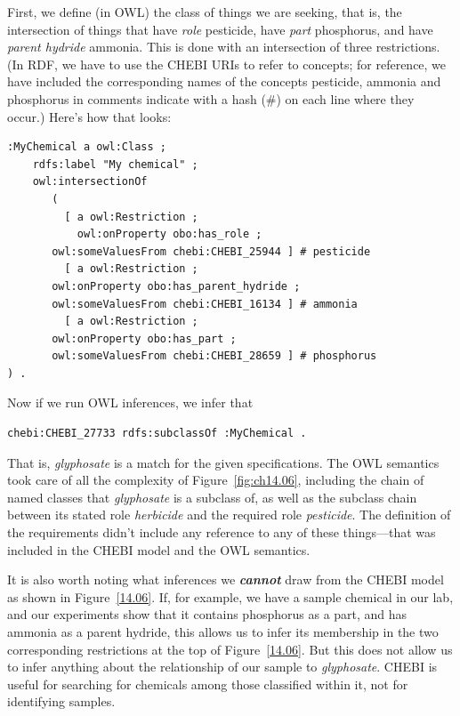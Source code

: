 First, we define (in OWL) the class of things we are seeking, that is,
the intersection of things that have \textit{role} pesticide, have \textit{part}
phosphorus, and have \textit{parent hydride} ammonia. This is done with an
intersection of three restrictions. (In RDF, we have to use the CHEBI
URIs to refer to concepts; for reference, we have included the
corresponding names of the concepts pesticide, ammonia and
phosphorus in comments indicate with a hash (\#) on each line where they
occur.) Here's how that looks:

\begin{lstlisting}
:MyChemical a owl:Class ;
    rdfs:label "My chemical" ;
    owl:intersectionOf
       (
         [ a owl:Restriction ;
           owl:onProperty obo:has_role ;
	   owl:someValuesFrom chebi:CHEBI_25944 ] # pesticide
         [ a owl:Restriction ;
	   owl:onProperty obo:has_parent_hydride ;
	   owl:someValuesFrom chebi:CHEBI_16134 ] # ammonia
         [ a owl:Restriction ;
	   owl:onProperty obo:has_part ;
	   owl:someValuesFrom chebi:CHEBI_28659 ] # phosphorus
) .
\end{lstlisting}

Now if we run OWL inferences, we infer that

\begin{lstlisting}
chebi:CHEBI_27733 rdfs:subclassOf :MyChemical .
\end{lstlisting}

That is, \textit{glyphosate} is a match for the given specifications. The OWL
semantics took care of all the complexity of Figure~\ref{fig:ch14.06}, including the
chain of named classes that \textit{glyphosate} is a subclass of, as well as the
subclass chain between its stated role \textit{herbicide} and the required role
\textit{pesticide}. The definition of the requirements didn't include any
reference to any of these things---that was included in the CHEBI model
and the OWL semantics.

It is also worth noting what inferences we \textbf{\textit{cannot}} draw from the CHEBI
model as shown in Figure~\ref{14.06}. If, for example, we have a sample
chemical in our lab, and our experiments show that it contains
phosphorus as a part, and has ammonia as a parent hydride, this allows
us to infer its membership in the two corresponding restrictions at the
top of Figure~\ref{14.06}. But this does not allow us to infer anything about
the relationship of our sample to \textit{glyphosate}. CHEBI is useful for
searching for chemicals among those classified within it, not for
identifying samples.

